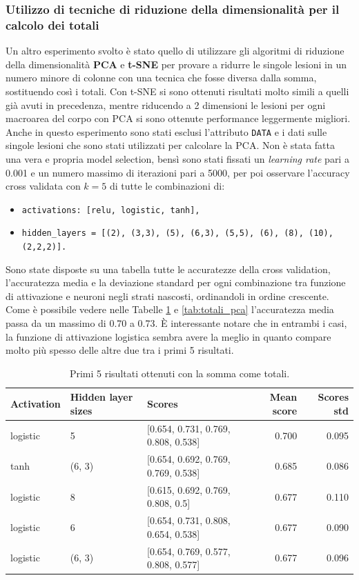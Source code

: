 \documentclass[12pt, twoside, letterpaper]{report}
\begin{document}
			\subsubsection{Utilizzo di tecniche di riduzione della dimensionalità per il calcolo dei totali} \label{par:pca_totali}
				Un altro esperimento svolto è stato quello di utilizzare gli algoritmi di riduzione della dimensionalità \textbf{PCA} e \textbf{t-SNE} per provare a ridurre le singole lesioni in un numero minore di colonne con una tecnica che fosse diversa dalla somma, sostituendo così i totali. Con t-SNE si sono ottenuti risultati molto simili a quelli già avuti in precedenza, mentre riducendo a 2 dimensioni le lesioni per ogni macroarea del corpo con PCA si sono ottenute performance leggermente migliori. Anche in questo esperimento sono stati esclusi l'attributo \texttt{DATA} e i dati sulle singole lesioni che sono stati utilizzati per calcolare la PCA. Non è stata fatta una vera e propria model selection, bensì sono stati fissati un \textit{learning rate} pari a 0.001 e un numero massimo di iterazioni pari a 5000, per poi osservare l'accuracy cross validata con $k=5$ di tutte le combinazioni di: 
				\begin{itemize}
					\item \texttt{activations: [relu, logistic, tanh],}
    				\item \texttt{hidden\_layers = [(2), (3,3), (5), (6,3), (5,5), (6), (8), (10), (2,2,2)].}
				\end{itemize}
				Sono state disposte su una tabella tutte le accuratezze della cross validation, l'accuratezza media e la deviazione standard per ogni combinazione tra funzione di attivazione e neuroni negli strati nascosti, ordinandoli in ordine crescente. Come è possibile vedere nelle Tabelle \ref{tab:totali_somma} e \ref{tab:totali_pca} l'accuratezza media passa da un massimo di 0.70 a 0.73. È interessante notare che in entrambi i casi, la funzione di attivazione logistica sembra avere la meglio in quanto compare molto più spesso delle altre due tra i primi 5 risultati.
				\begin{table}
					\begin{tabular}{lllrr}
					\toprule
					Activation & Hidden layer sizes &                               Scores &  Mean score &  Scores std \\
					\midrule
					logistic &                  5 &  [0.654, 0.731, 0.769, 0.808, 0.538] &       0.700 &       0.095 \\
					tanh &             (6, 3) &  [0.654, 0.692, 0.769, 0.769, 0.538] &       0.685 &       0.086 \\
					logistic &                  8 &    [0.615, 0.692, 0.769, 0.808, 0.5] &       0.677 &       0.110 \\
					logistic &                  6 &  [0.654, 0.731, 0.808, 0.654, 0.538] &       0.677 &       0.090 \\
					logistic &             (6, 3) &  [0.654, 0.769, 0.577, 0.808, 0.577] &       0.677 &       0.096 \\
					\bottomrule
					\end{tabular}
					\caption{Primi 5 risultati ottenuti con la somma come totali.}
					\label{tab:totali_somma}
				\end{table}
\end{document}
